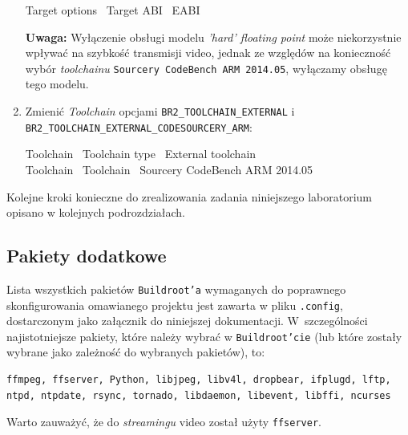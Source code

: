 \documentclass{article}
\newenvironment{ttblock}{\ttfamily}{\par}
\begin{document}
\begin{enumerate}
\begin{ttblock}
Target options \textrightarrow\ Target ABI \textrightarrow\ EABI
\end{ttblock}
\textbf{Uwaga:} Wyłączenie obsługi modelu \emph{'hard' floating point} może niekorzystnie wpływać na szybkość transmisji video, jednak ze względów na konieczność wybór \emph{toolchainu} \texttt{Sourcery CodeBench ARM 2014.05}, wyłączamy obsługę tego modelu.

\item Zmienić \emph{Toolchain} opcjami \texttt{BR2\_TOOLCHAIN\_EXTERNAL} i\\ \texttt{BR2\_TOOLCHAIN\_EXTERNAL\_CODESOURCERY\_ARM}:

\begin{ttblock}
Toolchain \textrightarrow\ Toolchain type \textrightarrow\ External toolchain\\
Toolchain \textrightarrow\ Toolchain \textrightarrow\ Sourcery CodeBench ARM 2014.05
\end{ttblock}

%
\end{enumerate}

Kolejne kroki konieczne do zrealizowania zadania niniejszego laboratorium opisano w kolejnych podrozdziałach.


\subsection{Pakiety dodatkowe}

Lista wszystkich pakietów \texttt{Buildroot'a} wymaganych do poprawnego skonfigurowania omawianego projektu jest zawarta w pliku \texttt{.config}, dostarczonym jako załącznik do niniejszej dokumentacji. W~szczególności najistotniejsze pakiety, które należy wybrać w \texttt{Buildroot'cie} (lub które zostały wybrane jako zależność do wybranych pakietów), to:
\begin{verbatim}
ffmpeg, ffserver, Python, libjpeg, libv4l, dropbear, ifplugd, lftp,
ntpd, ntpdate, rsync, tornado, libdaemon, libevent, libffi, ncurses
\end{verbatim}
Warto zauważyć, że do \emph{streamingu} video został użyty \texttt{ffserver}.
\end{document}
